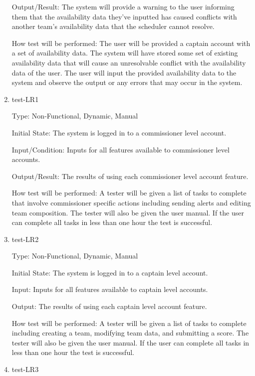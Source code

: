 \documentclass[12pt, titlepage]{article}
\begin{document}
\begin{enumerate}
  Output/Result: The system will provide a warning to the user informing them that
  the availability data they've inputted has caused conflicts with another team's
  availability data that the scheduler cannot resolve.
            
  How test will be performed: The user will be provided a captain account with a set 
  of availability data. The system will have stored some set of existing availability 
  data that will cause an unresolvable conflict with the availability data of the user.
  The user will input the provided availability data to the system and observe the 
  output or any errors that may occur in the system.

  \item{test-LR1\\}

  Type: Non-Functional, Dynamic, Manual

  Initial State: The system is logged in to a commissioner level account.

  Input/Condition: Inputs for all features available to commissioner 
  level accounts.

  Output/Result: The results of using each commissioner level account 
  feature.

  How test will be performed: A tester will be given a list of tasks to
  complete that involve commissioner specific actions including sending 
  alerts and editing team composition. 
  The tester will also be given the user manual. If the user can
  complete all tasks in less than one hour the test is successful.

  \item{test-LR2\\}

  Type: Non-Functional, Dynamic, Manual

  Initial State: The system is logged in to a captain level account.

  Input: Inputs for all features available to captain level accounts.

  Output: The results of using each captain level account feature.

  How test will be performed: A tester will be given a list of tasks to
  complete including creating a team, modifying team data, and submitting a
  score. The tester will also be given the user manual. If the user can
  complete all tasks in less than one hour the test is successful.

  \item{test-LR3\\}


\end{enumerate}
\end{document}
